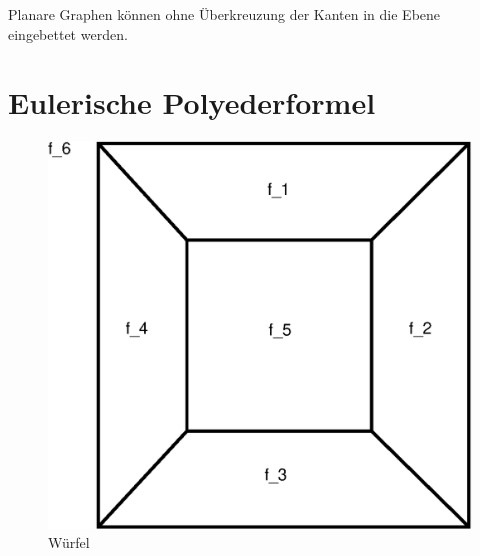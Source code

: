 Planare Graphen können ohne Überkreuzung der Kanten in die Ebene eingebettet werden.

\section{Eulerische Polyederformel}
\begin{figure}
	\vspace*{-30pt}
	\centering
	\includegraphics[width=\linewidth]{15/Grafik/Polyeder}
	\caption{Würfel}
	\label{fig:Polyeder}
	\vspace{-500pt}
\end{figure}

